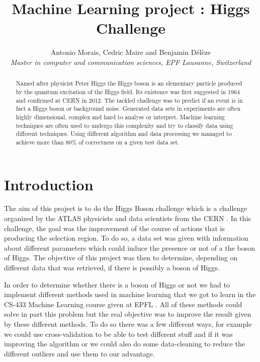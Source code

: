 \documentclass[10pt,conference,compsocconf]{IEEEtran}
\begin{document}
\title{Machine Learning project : Higgs Challenge}

\author{
  Antonio Morais, Cedric Maire and Benjamin D\'el\`eze \\
  \textit{Master in computer and communication sciences, EPF Lausanne, Switzerland}
}

\maketitle

\begin{abstract}
  Named after physicist Peter Higgs the Higgs boson is an elementary particle produced by the quantum excitation of the Higgs field. Its existence was first suggested in 1964 and confirmed at CERN in 2012. The tackled challenge was to predict if an event is in fact a Higgs boson or background noise. Generated data sets in experiments are often highly dimensional, complex and hard to analyse or interpret. Machine learning techniques are often used to undergo this complexity and try to classify data using different techniques. Using different algorithm and data processing we managed to achieve more than 80\% of correctness on a given test data set.
\end{abstract}

\section{Introduction}

The aim of this project is to do the Higgs Boson challenge which is a challenge organized by the ATLAS physicists and data scientists from the CERN \cite{higgsChallenge14}. In this challenge, the goal was the improvement of the course of actions that is producing the selection region. To do so, a data set was given with information about different parameters which could induce the presence or not of a the boson of Higgs. The objective of this project was then to determine, depending on different data that was retrieved, if there is possibly a boson of Higgs.

In order to determine whether there is a boson of Higgs or not we had to implement different methods used in machine learning that we got to learn in the CS-433 Machine Learning course given at EPFL \cite{MLcourse18}. All of these methods could solve in part this problem but the real objective was to improve the result given by these different methods. To do so there was a few different ways, for example we could use cross-validation to be able to test different stuff and if it was improving the algorithm or we could also do some data-cleaning to reduce the different outliers and use them to our advantage.
\end{document}

